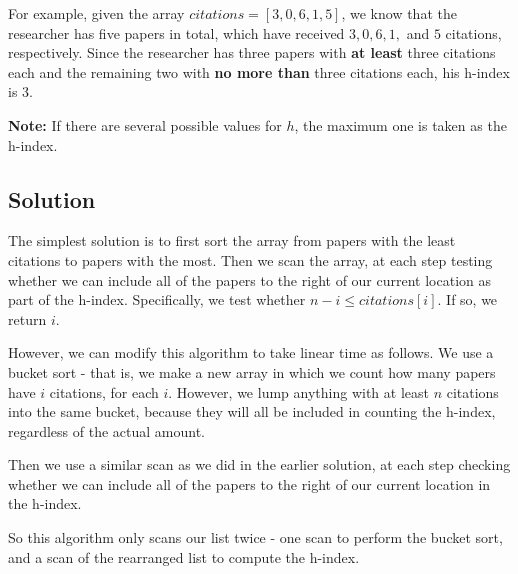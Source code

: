 \normalfont\documentclass[letterpaper,11pt]{article}
\begin{document}
For example, given the array $citations = [3, 0, 6, 1 ,5]$, we know that the researcher has five papers in total, which have received $3, 0, 6, 1,$ and $5$ citations, respectively. Since the researcher has three papers with \textbf{at least} three citations each and the remaining two with \textbf{no more than} three citations each, his h-index is 3.

\textbf{Note:} If there are several possible values for $h$, the maximum one is taken as the h-index.

\subsection*{Solution}
The simplest solution is to first sort the array from papers with the least citations to papers with the most. Then we scan the array, at each step testing whether we can include all of the papers to the right of our current location as part of the h-index. Specifically, we test whether $n - i \leq citations[i]$. If so, we return $i$.

However, we can modify this algorithm to take linear time as follows. We use a bucket sort - that is, we make a new array in which we count how many papers have $i$ citations, for each $i$. However, we lump anything with at least $n$ citations into the same bucket, because they will all be included in counting the h-index, regardless of the actual amount.

Then we use a similar scan as we did in the earlier solution, at each step checking whether we can include all of the papers to the right of our current location in the h-index.

So this algorithm only scans our list twice - one scan to perform the bucket sort, and a scan of the rearranged list to compute the h-index.
\end{document}
